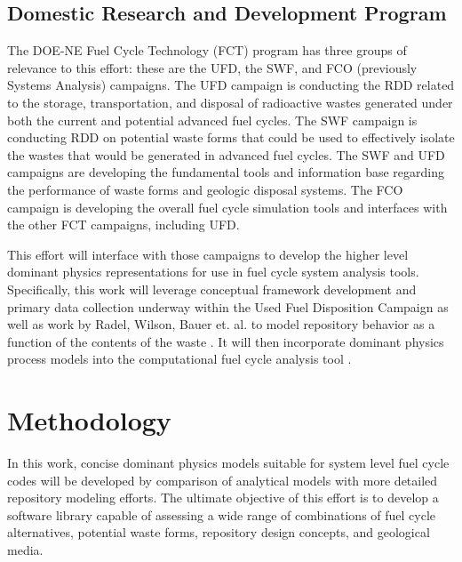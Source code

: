 \subsection{Domestic Research and Development Program}

The DOE-NE Fuel Cycle Technology (FCT) program has three groups of relevance to 
this effort: these are the \gls{UFD}, the \gls{SWF}, and \gls{FCO} (previously 
Systems Analysis) campaigns.  
The \gls{UFD} campaign is conducting the \gls{RDD} related to the storage, 
transportation, and disposal of radioactive wastes generated under both the 
current and potential advanced fuel cycles.  The SWF campaign is conducting 
\gls{RDD} on potential waste forms that could be used to effectively isolate the 
wastes that would be generated in advanced fuel cycles.  The \gls{SWF} and
\gls{UFD} campaigns are developing the fundamental tools and information base 
regarding the performance of waste forms and geologic disposal systems.  The 
\gls{FCO} campaign is developing the overall fuel cycle simulation tools and 
interfaces with the other FCT campaigns, including \gls{UFD}.  

This effort will interface with those campaigns to develop the higher level
dominant physics representations for use in fuel cycle system analysis tools.
Specifically, this work will leverage conceptual framework development and
primary data collection underway within the Used Fuel Disposition Campaign as
well as work by Radel, Wilson, Bauer et. al. to model repository behavior as a
function of the contents of the waste \cite{radel_effect_2007}.  It will then 
incorporate dominant physics process models into the \Cyclus computational 
fuel cycle analysis tool \cite{huff_cyclus:_2010}.




\section{Methodology} 


In this work, concise dominant physics models suitable for system level fuel 
cycle codes will be developed by comparison of analytical models with more 
detailed repository modeling efforts. The ultimate objective of this effort is 
to develop a software library capable of assessing a wide range of combinations 
of fuel cycle alternatives, potential waste forms, repository design concepts, 
and geological media. 



